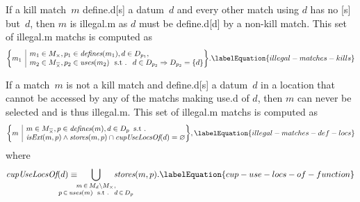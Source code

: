 If a \gls{kill match}~$m$ \gls{define.d}[s] a \gls{datum}~$d$ and every other
\gls{match} using $d$ has no [s] but~$d$, then $m$
is \gls{illegal.m} as $d$ must be \gls{define.d}[d] by a non-\gls{kill match}.
%
This set of \gls{illegal.m} \glspl{match} is computed as
%
\begin{equation}
  \mSetBuilder*{m_1}%
               {%
                 \begin{array}{@{}l@{}}
                   m_1 \in \mKillMatchSet,
                   p_1 \in \mDefines(m_1),
                   d \in \mDataSet[p_1], \\
                   m_2 \in \mKillMatchCompSet,
                   p_2 \in \mUses(m_2) \text{ \st }
                   d \in \mDataSet[p_2] \mImp \mDataSet[p_2] = \mSet{d}
                 \end{array}
               }\!.
  \labelEquation{illegal-matches-kills}
\end{equation}

If a \gls{match}~$m$ is not a \gls{kill match} and \gls{define.d}[s] a
\gls{datum}~$d$ in a location that cannot be accessed by any of the
\glspl{match} making \gls{use.d} of $d$, then $m$ can never be selected and is
thus \gls{illegal.m}.
%
This set of \gls{illegal.m} \glspl{match} is computed as
%
\begin{equation}
  \mSetBuilder*{m}%
               {%
                 \begin{array}{@{}l@{}}
                   m \in \mKillMatchCompSet,
                   p \in \mDefines(m),
                   d \in \mDataSet[p] \hspace{-1pt} \text{ \st} \\
                   \mIsExt(m, p)
                   \mAnd
                   \mStores(m, p) \cap \mCupUseLocsOf(d) = \mEmptySet
                 \end{array}
               }\!,
  \labelEquation{illegal-matches-def-locs}
\end{equation}
%
where
%
\begin{equation}
  \mCupUseLocsOf(d)
  \equiv
  \hspace{-2.5em}
  \bigcup_{\substack{%
                   m \, \in \, \mMatchSet[d] \setminus \mKillMatchSet, \\
                   p \, \in \, \mUses(m)
                   \text{ \st } d \, \in \, \mDataSet[p]
                  }}
    \hspace{-2.5em}
    \mStores(m, p).
  \labelEquation{cup-use-locs-of-function}
\end{equation}

